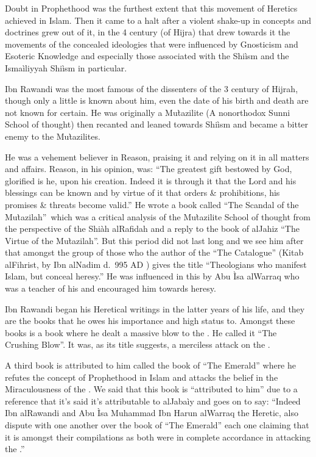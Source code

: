 \documentclass[12pt]{memoir}
\begin{document}
Doubt in Prophethood was the furthest extent that this movement of Heretics
achieved in Islam. Then it came to a halt after a violent shake-up in concepts
and doctrines grew out of it,
in the 4 century (of Hijra) that drew towards
it the movements of the concealed ideologies that were influenced by Gnosticism
and Esoteric Knowledge and especially those associated with the Shi\`ism
and the Isma\`iliyyah Shi\`ism in particular.

Ibn Rawandi was the most famous of the dissenters
of the 3 century of Hijrah,
though only a little is known about him,
even the date of his birth and death are not known for certain.
He was originally a Mu\`tazilite (A non\–orthodox Sunni School of thought)
then recanted and leaned towards Shi\`ism and became
a bitter enemy to the Mu\`tazilites.

He was a vehement believer in Reason, praising it and relying on it in all
matters and affairs. Reason, in his opinion, was: “The greatest gift bestowed
by God, glorified is he, upon his creation. Indeed it is through it that the
Lord and his blessings can be known and by virtue of it that orders \&
prohibitions, his promises \& threats become valid.”\fnmark\@
He wrote a book called “The Scandal of the Mu\`tazilah”\fnmark\
which was a critical analysis of the Mu\`tazilite School of thought
from the perspective of the Shi\`ah al\–Rafidah and
a reply to the book of al\–Jahiz “The Virtue of the Mu\`tazilah”.
But this period did not last long and we see him after that
amongst the group of those who the author of the “The Catalogue” (Kitab
al\–Fihrist, by Ibn al\–Nadim d.\ 995 AD ) gives the title “Theologians who
manifest Islam, but conceal heresy.”
He was influenced in this by Abu \`Isa al\–Warraq
who was a teacher of his and encouraged him towards heresy.


Ibn Rawandi began his Heretical writings in the latter years of his life, and
they are the books that he owes his importance and high status to. Amongst
these books is a book where he dealt a massive blow to the \Quran. He called it
“The Crushing Blow”. It was, as its title suggests, a merciless attack on the
\Quran.

A third book is attributed to him called the book of “The Emerald” where he
refutes the concept of Prophethood in Islam and attacks the belief in the
Miraculousness of the \Quran. We said that this book is “attributed to him” due
to a reference that it’s said it’s attributable to al\–Jaba\`iy and goes on to
say: “Indeed Ibn al\–Rawandi and Abu \`Isa Muhammad Ibn Harun al\–Warraq the
Heretic, also dispute with one another over the book of “The Emerald” each one
claiming that it is amongst their compilations as both were in complete
accordance in attacking the \Quran.”\fnmark
\end{document}
